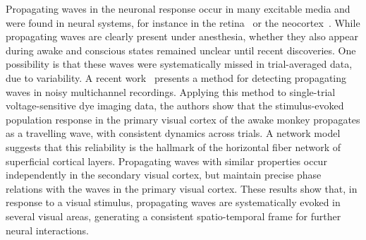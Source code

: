 \documentclass[brainsci, %
               review,submit,pdftex,moreauthors
               ]{Definitions/mdpi}
\begin{document}
Propagating waves in the neuronal response occur in many excitable media and were found in neural systems, for instance in the retina~\citep{feller_dynamic_1997} or the neocortex~\citep{bienenstock_model_1995}. While propagating waves are clearly present under anesthesia, whether they also appear during awake and conscious states remained unclear until recent discoveries. One possibility is that these waves were systematically missed in trial-averaged data, due to variability. A recent work~\citep{muller_stimulus-evoked_2014} presents a method for detecting propagating waves in noisy multichannel recordings. Applying this method to single-trial voltage-sensitive dye imaging data, the authors show that the stimulus-evoked population response in the primary visual cortex of the awake monkey propagates as a travelling wave, with consistent dynamics across trials. A network model suggests that this reliability is the hallmark of the horizontal fiber network of superficial cortical layers. Propagating waves with similar properties occur independently in the secondary visual cortex, but maintain precise phase relations with the waves in the primary visual cortex. These results show that, in response to a visual stimulus, propagating waves are systematically evoked in several visual areas, generating a consistent spatio-temporal frame for further neural interactions.
\end{document}
